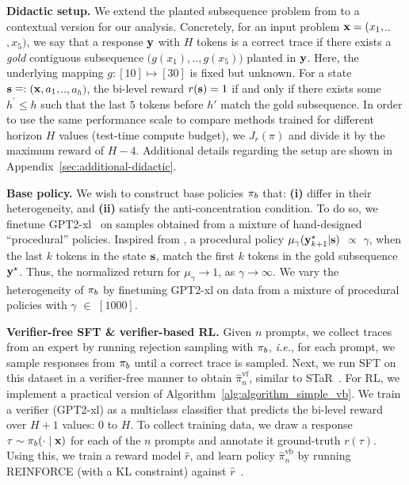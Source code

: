 \textbf{Didactic setup.} We extend the planted subsequence problem from \citet{setlur2024rewarding}  to a contextual version for our analysis. Concretely, for an input problem  $\mathbf{x} = (x_1,$$..$$, x_5)$, we say that a response $\mathbf{y}$ with $H$ tokens
is a correct trace if there exists a \emph{gold} contiguous subsequence $(g(x_1),$$..,$$g(x_{5}))$ planted in $\mathbf{y}$. Here, the underlying mapping $g:[10]$$\mapsto$$[30]$ is fixed but unknown.  For a state $\mathbf{s} \mathrel{\mathop=}: (\mathbf{x}, a_1,$$ ..$$, a_h)$, the bi-level reward $r(\mathbf{s}) = 1$ if and only if there exists some $h^\prime \leq h$ such that the last $5$ tokens before $h'$  
match the gold subsequence.  In order to use the same performance scale to compare  methods trained for different horizon $H$ values (test-time compute budget), we  $J_r(\pi)$ and divide it by the maximum reward of $H-4$. Additional details regarding the setup are shown in Appendix~\ref{sec:additional-didactic}.


\textbf{Base policy.} We wish to construct base policies $\pi_b$ that: \textbf{(i)} differ in their heterogeneity, and \textbf{(ii)} satisfy the anti-concentration condition. To do so, we finetune GPT2-xl~\cite{radford2019language} on samples obtained from a mixture of hand-designed ``procedural'' policies. Inspired from \citet{setlur2024rewarding}, a procedural policy $\mu_\gamma (\mathbf{y}^\star_{k+1} | \mathbf{s})$ $\propto$ $\gamma$, when the last $k$ tokens in the state $\mathbf{s}$, match the first $k$ tokens in the gold subsequence $\mathbf{y}^\star$.  Thus, the normalized return for $\mu_\gamma$$\rightarrow$$1$, as $\gamma$$\rightarrow$$\infty$. We vary the heterogeneity of $\pi_b$ by finetuning GPT2-xl on data from a mixture of procedural policies with $\gamma$ $\in$ $[1000]$.

\textbf{Verifier-free SFT \& verifier-based RL.} Given  $n$ prompts, we collect traces from an expert by running rejection sampling with $\pi_b$, \textit{i.e.}, for each prompt, we  sample responses from  $\pi_b$ until a correct trace is sampled. Next, we run SFT on this dataset in a verifier-free manner to obtain $\hat{\pi}^{\mathrm{vf}}_n$, similar to STaR~\citep{zelikman2022star}. 
For RL, we implement a practical version of Algorithm~\ref{alg:algorithm_simple_vb}. We train a verifier (GPT2-xl) as a multiclass classifier that predicts the bi-level reward over $H\!+\!1$ values: $0$ to $H$. To collect training data, we draw a response $\tau \sim \pi_b(\cdot \mid \mathbf{x})$ for each of the $n$ prompts and annotate it ground-truth $r(\tau)$. 
Using this, we train a reward model $\hat{r}$, and learn policy  $\hat{\pi}^{\mathrm{vb}}_n$ by running REINFORCE 
 (with a KL constraint) against $\hat{r}$~\citep{ahmadian2024back}.








